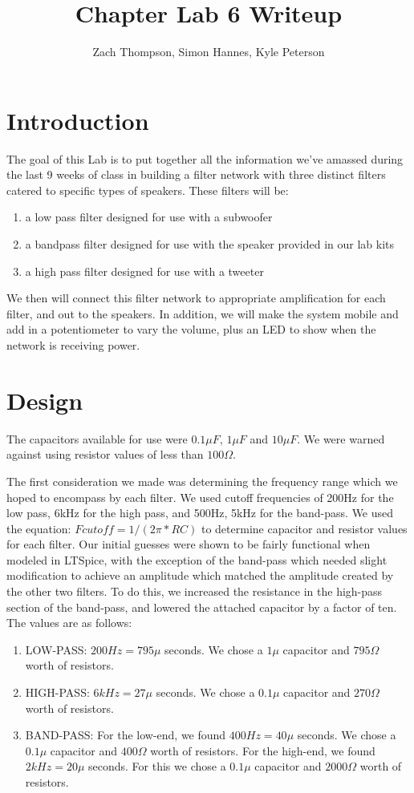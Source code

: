\documentclass{article}
\title{Chapter Lab 6 Writeup}
\author{Zach Thompson, Simon Hannes, Kyle Peterson}
\begin{document}
\maketitle{}

\section*{Introduction}
The goal of this Lab is to put together all the information we've amassed 
during the last 9 weeks of class in building a filter network with three
distinct filters catered to specific types of speakers. These filters will
be:
\begin{enumerate}
\item a low pass filter designed for use with a subwoofer
\item a bandpass filter designed for use with the speaker provided in our lab kits
\item a high pass filter designed for use with a tweeter
\end{enumerate}

We then will connect this filter network to appropriate amplification for each 
filter, and out to the speakers. In addition, we will make the system mobile
 and add in a potentiometer to vary the volume, plus an LED to show when the 
network is receiving power.

\section*{Design}
The capacitors available for use were $0.1\mu F$, $1\mu F$ and $10\mu F$. We 
were warned against using resistor values of less than $100\Omega$.

The first consideration we made was determining the frequency range which 
we hoped to encompass by each filter. We used cutoff frequencies of 200Hz
for the low pass, 6kHz for the high pass, and 500Hz, 5kHz for the band-pass.
We used the equation: $Fcutoff = 1/(2\pi*RC)$ to determine capacitor and 
resistor values for each filter. Our initial guesses were shown to be fairly 
functional when modeled in LTSpice, with the exception of the band-pass which 
needed slight modification to achieve an amplitude which matched the amplitude 
created by the other two  filters. To do this, we increased the resistance
in the high-pass section of  the band-pass, and lowered the attached capacitor
by a factor of ten. The values are as follows:
\begin{enumerate}
\item LOW-PASS: $200Hz=795\mu$ seconds. We chose a $1\mu$ capacitor and 
$795\Omega$ worth of resistors.
\item HIGH-PASS: $6kHz=27\mu$ seconds. We chose a $0.1\mu$ capacitor and 
$270\Omega$ worth of resistors. 
\item BAND-PASS: For the low-end, we found $400Hz=40\mu$ seconds. We chose a 
$0.1\mu$ capacitor and $400\Omega$ worth of resistors. For the high-end, we found
$2kHz=20\mu$ seconds. For this we chose a $0.1\mu$ capacitor and $2000\Omega$
worth of resistors.
\end{enumerate}
\end{document}
